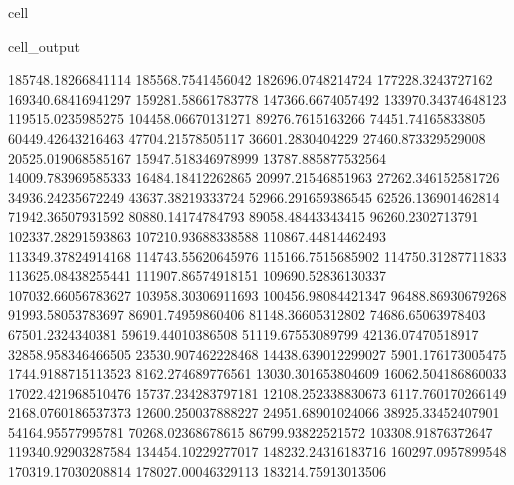 \documentclass[letterpaper,10pt,english]{jupyterBook}
\begin{document}
\begin{sphinxuseclass}{cell}
\begin{sphinxVerbatimOutput}
\begin{sphinxuseclass}{cell_output}
\begin{sphinxVerbatim}[commandchars=\\\{\}]
185748.18266841114  185568.7541456042  182696.0748214724  177228.3243727162  169340.68416941297  159281.58661783778  147366.6674057492  133970.34374648123  119515.0235985275  104458.06670131271  89276.7615163266  74451.74165833805  60449.42643216463  47704.21578505117  36601.2830404229  27460.873329529008  20525.019068585167  15947.518346978999  13787.885877532564  14009.783969585333  16484.18412262865  20997.21546851963  27262.346152581726  34936.24235672249  43637.38219333724  52966.291659386545  62526.136901462814  71942.36507931592  80880.14174784793  89058.48443343415  96260.2302713791  102337.28291593863  107210.93688338588  110867.44814462493  113349.37824914168  114743.55620645976  115166.7515685902  114750.31287711833  113625.08438255441  111907.86574918151  109690.52836130337  107032.66056783627  103958.30306911693  100456.98084421347  96488.86930679268  91993.58053783697  86901.74959860406  81148.36605312802  74686.65063978403  67501.2324340381  59619.44010386508  51119.67553089799  42136.07470518917  32858.958346466505  23530.907462228468  14438.639012299027  5901.176173005475  \PYGZhy{}1744.9188715113523  \PYGZhy{}8162.274689776561  \PYGZhy{}13030.301653804609  \PYGZhy{}16062.504186860033  \PYGZhy{}17022.421968510476  \PYGZhy{}15737.234283797181  \PYGZhy{}12108.252338830673  \PYGZhy{}6117.760170266149  2168.0760186537373  12600.250037888227  24951.68901024066  38925.33452407901  54164.95577995781  70268.02368678615  86799.93822521572  103308.91876372647  119340.92903287584  134454.10229277017  148232.24316183716  160297.0957899548  170319.17030208814  178027.00046329113  183214.75913013506  

\end{sphinxVerbatim}
\end{sphinxuseclass}
\end{sphinxVerbatimOutput}
\end{sphinxuseclass}
\end{document}
